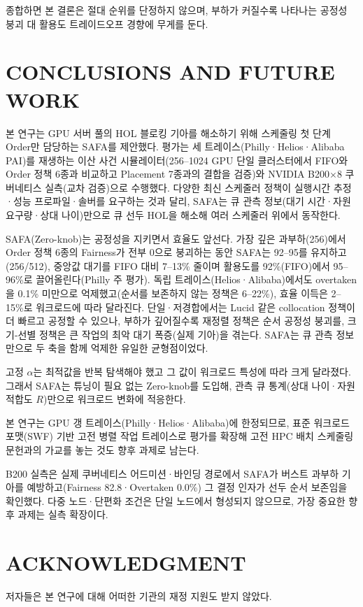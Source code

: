 \documentclass{ieeetj}
\begin{document}
종합하면 본 결론은 절대 순위를 단정하지 않으며, 부하가 커질수록 나타나는 공정성 붕괴 대 활용도 트레이드오프 경향에 무게를 둔다.

\FloatBarrier

\section{CONCLUSIONS AND FUTURE WORK}\label{conclu}

본 연구는 GPU 서버 풀의 HOL 블로킹 기아를 해소하기 위해 스케줄링 첫 단계 Order만 담당하는 SAFA를 제안했다. 평가는 세 트레이스(Philly·Helios·Alibaba PAI)를 재생하는 이산 사건 시뮬레이터(256--1024 GPU 단일 클러스터에서 FIFO와 Order 정책 6종과 비교하고 Placement 7종과의 결합을 검증)와 NVIDIA B200$\times$8 쿠버네티스 실측(교차 검증)으로 수행했다. 다양한 최신 스케줄러 정책이 실행시간 추정·성능 프로파일·솔버를 요구하는 것과 달리, SAFA는 큐 관측 정보(대기 시간·자원 요구량·상대 나이)만으로 큐 선두 HOL을 해소해 여러 스케줄러 위에서 동작한다.

SAFA(Zero-knob)는 공정성을 지키면서 효율도 앞선다. 가장 깊은 과부하(256)에서 Order 정책 6종의 Fairness가 전부 0으로 붕괴하는 동안 SAFA는 92--95를 유지하고(256/512), 중앙값 대기를 FIFO 대비 7--13\% 줄이며 활용도를 92\%(FIFO)에서 95--96\%로 끌어올린다(Philly 주 평가). 독립 트레이스(Helios·Alibaba)에서도 overtaken을 0.1\% 미만으로 억제했고(순서를 보존하지 않는 정책은 6--22\%), 효율 이득은 2--15\%로 워크로드에 따라 달라진다. 단일·저경합에서는 Lucid 같은 collocation 정책이 더 빠르고 공정할 수 있으나, 부하가 깊어질수록 재정렬 정책은 순서 공정성 붕괴를, 크기-선별 정책은 큰 작업의 최악 대기 폭증(실제 기아)을 겪는다. SAFA는 큐 관측 정보만으로 두 축을 함께 억제한 유일한 균형점이었다.

고정 $\alpha$는 최적값을 반복 탐색해야 했고 그 값이 워크로드 특성에 따라 크게 달라졌다. 그래서 SAFA는 튜닝이 필요 없는 Zero-knob를 도입해, 관측 큐 통계(상대 나이·자원 적합도 $R$)만으로 워크로드 변화에 적응한다.

본 연구는 GPU 갱 트레이스(Philly·Helios·Alibaba)에 한정되므로, 표준 워크로드 포맷(SWF) 기반 고전 병렬 작업 트레이스로 평가를 확장해 고전 HPC 배치 스케줄링 문헌과의 가교를 놓는 것도 향후 과제로 남는다.

B200 실측은 실제 쿠버네티스 어드미션·바인딩 경로에서 SAFA가 버스트 과부하 기아를 예방하고(Fairness 82.8·Overtaken 0.0\%) 그 결정 인자가 선두 순서 보존임을 확인했다. 다중 노드·단편화 조건은 단일 노드에서 형성되지 않으므로, 가장 중요한 향후 과제는 실측 확장이다.

\FloatBarrier
\section*{ACKNOWLEDGMENT}
저자들은 본 연구에 대해 어떠한 기관의 재정 지원도 받지 않았다.
\end{document}
